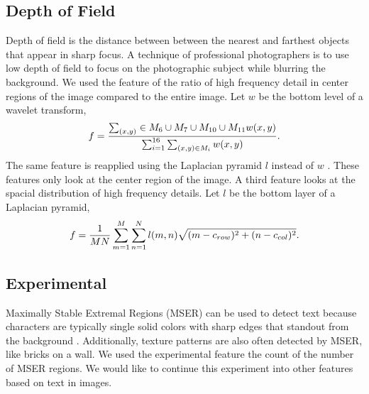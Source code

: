 \documentclass[conference,a4paper]{IEEEtran}
\begin{document}
  \subsection{Depth of Field}
  Depth of field is the distance between between the nearest and farthest objects that appear in sharp focus.  A technique of professional photographers is to use low depth of field to focus on the photographic subject while blurring the background.  We used the feature \cite{datta2006studying} of the ratio of high frequency detail in center regions of the image compared to the entire image.  Let $w$ be the bottom level of a wavelet transform,
  \begin{equation}
    f ={\sum_{(x,y)}\in M_6\cup M_7\cup M_{10}\cup M_{11} w(x,y) \over \sum_{i=1}^{16}\sum_{(x,y)\in M_i} w(x,y)} .
  \end{equation}
  The same feature is reapplied using the Laplacian pyramid $l$ instead of $w$ \cite{wang2015automatic}.  These features only look at the center region of the image.  A third feature \cite{wang2015automatic} looks at the spacial distribution of high frequency details.  Let $l$ be the bottom layer of a Laplacian pyramid,
  \begin{equation}
    f = {1 \over MN} \sum_{m=1}^M\sum_{n=1}^N l(m,n)\sqrt{(m-c_{row})^2 + (n-c_{col})^2} .
  \end{equation}

  \subsection{Experimental}
  Maximally Stable Extremal Regions (MSER) \cite{matas2004robust} can be used to detect text because characters are typically single solid colors with sharp edges that standout from the background \cite{chen2011robust}.  Additionally, texture patterns are also often detected by MSER, like bricks on a wall.  We used the experimental feature the count of the number of MSER regions.  We would like to continue this experiment into other features based on text in images.
 
\end{document}
